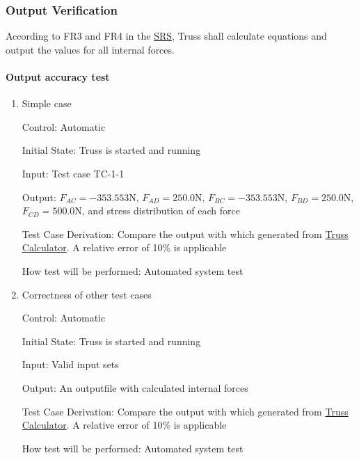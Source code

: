 \documentclass[12pt, titlepage]{article}
\begin{document}
\subsubsection{Output Verification} \label{outverify}
According to FR3 and FR4 in the 
\href{https://github.com/tingyuw/cas741/blob/master/docs/SRS/SRS.pdf}{SRS}, 
Truss shall calculate equations and output the values for all internal forces. 

\paragraph{Output accuracy test}

\begin{enumerate}
	
	\item{Simple case\\}
	
	Control: Automatic
	
	Initial State: Truss is started and running
	
	Input: Test case TC-1-1
	
	Output: $F_{AC} = -353.553 \si{\newton}$, $F_{AD} = 250.0 \si{\newton}$, 
	$F_{BC} = -353.553 \si{\newton}$, $F_{BD} = 250.0 \si{\newton}$, $F_{CD} = 
	500.0 \si{\newton}$, and stress distribution of each force
	
	Test Case Derivation: Compare the output with which generated from
	\href{https://skyciv.com/free-truss-calculator/}{Truss Calculator}. A 
	relative error of 10\% is applicable
	
	How test will be performed: Automated system test
	
	\item{Correctness of other test cases\\}
	
	Control: Automatic
	
	Initial State: Truss is started and running
	
	Input: Valid input sets
	
	Output: An outputfile with calculated internal forces
	
	Test Case Derivation: Compare the output with which generated from
	\href{https://skyciv.com/free-truss-calculator/}{Truss Calculator}. A 
	relative error of 10\% is applicable
	
	How test will be performed: Automated system test
\end{enumerate}
\end{document}
